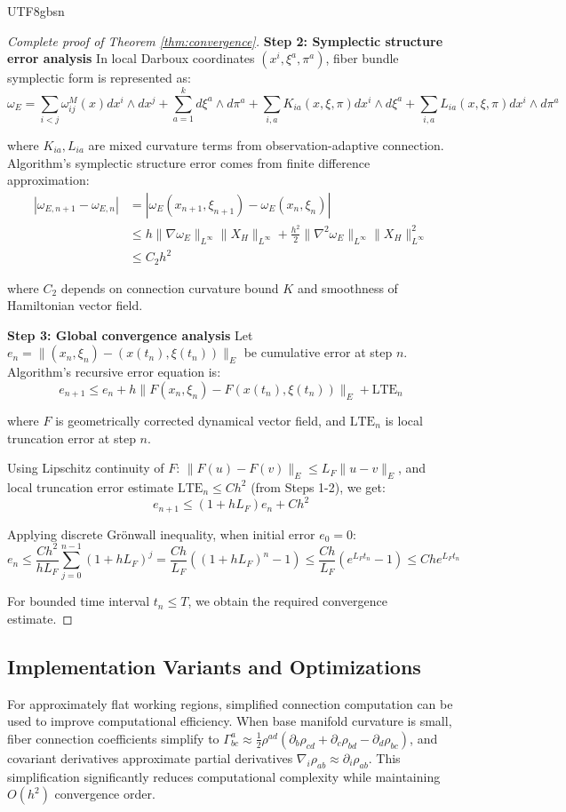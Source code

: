 \documentclass[a4paper,12pt]{extarticle}
\theoremstyle{definition}
\begin{document}
\begin{CJK}{UTF8}{gbsn}
\begin{proof}[Complete proof of Theorem \ref{thm:convergence}]
\textbf{Step 2: Symplectic structure error analysis}
In local Darboux coordinates $(x^i, \xi^a, \pi^a)$, fiber bundle symplectic form is represented as:
$$\omega_E = \sum_{i<j} \omega_{ij}^M(x) dx^i \wedge dx^j + \sum_{a=1}^k d\xi^a \wedge d\pi^a + \sum_{i,a} K_{ia}(x,\xi,\pi) dx^i \wedge d\xi^a + \sum_{i,a} L_{ia}(x,\xi,\pi) dx^i \wedge d\pi^a$$

where $K_{ia}, L_{ia}$ are mixed curvature terms from observation-adaptive connection. Algorithm's symplectic structure error comes from finite difference approximation:
\begin{align*}
|\omega_{E,n+1} - \omega_{E,n}| &= |\omega_E(x_{n+1}, \xi_{n+1}) - \omega_E(x_n, \xi_n)| \\
&\leq h\|\nabla\omega_E\|_{L^\infty}\|X_H\|_{L^\infty} + \frac{h^2}{2}\|\nabla^2\omega_E\|_{L^\infty}\|X_H\|_{L^\infty}^2 \\
&\leq C_2 h^2
\end{align*}

where $C_2$ depends on connection curvature bound $K$ and smoothness of Hamiltonian vector field.

\textbf{Step 3: Global convergence analysis}
Let $e_n = \|(x_n, \xi_n) - (x(t_n), \xi(t_n))\|_E$ be cumulative error at step $n$. Algorithm's recursive error equation is:
$$e_{n+1} \leq e_n + h \|F(x_n, \xi_n) - F(x(t_n), \xi(t_n))\|_E + \text{LTE}_n$$

where $F$ is geometrically corrected dynamical vector field, and $\text{LTE}_n$ is local truncation error at step $n$.

Using Lipschitz continuity of $F$: $\|F(u) - F(v)\|_E \leq L_F\|u - v\|_E$, and local truncation error estimate $\text{LTE}_n \leq C h^2$ (from Steps 1-2), we get:
$$e_{n+1} \leq (1 + hL_F)e_n + Ch^2$$

Applying discrete Grönwall inequality, when initial error $e_0 = 0$:
$$e_n \leq \frac{Ch^2}{hL_F} \sum_{j=0}^{n-1}(1 + hL_F)^j = \frac{Ch}{L_F}((1 + hL_F)^n - 1) \leq \frac{Ch}{L_F}(e^{L_F t_n} - 1) \leq Ch e^{L_F t_n}$$

For bounded time interval $t_n \leq T$, we obtain the required convergence estimate.
\end{proof}

\subsection{Implementation Variants and Optimizations}
\label{appendix:implementation_variants}

For approximately flat working regions, simplified connection computation can be used to improve computational efficiency. When base manifold curvature is small, fiber connection coefficients simplify to $\Gamma^a_{bc} \approx \frac{1}{2}\rho^{ad}(\partial_b \rho_{cd} + \partial_c \rho_{bd} - \partial_d \rho_{bc})$, and covariant derivatives approximate partial derivatives $\nabla_i \rho_{ab} \approx \partial_i \rho_{ab}$. This simplification significantly reduces computational complexity while maintaining $O(h^2)$ convergence order.


\end{CJK}
\end{document}
